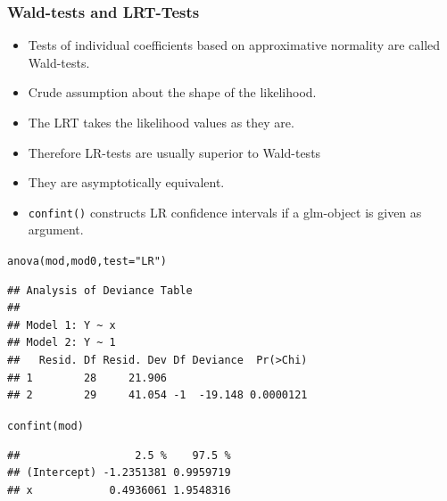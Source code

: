 \documentclass[extsize,handout,10pt]{beamer}\usepackage[]{graphicx}\usepackage[]{color}
\makeatletter
\newcommand{\hlstr}[1]{\textcolor[rgb]{1,0.4,0.2}{#1}}%
\newcommand{\hlstd}[1]{\textcolor[rgb]{0.251,0.251,0.251}{#1}}%
\newcommand{\hlkwc}[1]{\textcolor[rgb]{0.188,0.941,0.314}{#1}}%
\newcommand{\hlkwd}[1]{\textcolor[rgb]{0.69,0.188,0.941}{#1}}%
\newenvironment{kframe}{%
 \def\at@end@of@kframe{}%
 \ifinner\ifhmode%
  \def\at@end@of@kframe{\end{minipage}}%
  \begin{minipage}{\columnwidth}%
 \fi\fi%
 \def\FrameCommand##1{\hskip\@totalleftmargin \hskip-\fboxsep
 \colorbox{shadecolor}{##1}\hskip-\fboxsep
     \hskip-\linewidth \hskip-\@totalleftmargin \hskip\columnwidth}%
 \MakeFramed {\advance\hsize-\width
   \@totalleftmargin\z@ \linewidth\hsize
   \@setminipage}}%
 {\par\unskip\endMakeFramed%
 \at@end@of@kframe}
\newenvironment{knitrout}{}{} %
\makeatother
\begin{document}
\begin{frame}[fragile]
  \frametitle{Wald-tests and LRT-Tests}

  \begin{itemize}
  \item Tests of individual coefficients based on approximative normality are
    called \alert{Wald}-tests. 
  \item Crude assumption about the
    shape of the likelihood. 
  \item The LRT takes the likelihood values as they are. 
  \item Therefore LR-tests are usually superior to Wald-tests
  \item They are asymptotically equivalent.
  \item \texttt{confint()} constructs LR confidence intervals if a
    glm-object is given as argument.
  \end{itemize}

\begin{knitrout}\tiny
{}\color{fgcolor}\begin{kframe}
\begin{alltt}
\hlkwd{anova}\hlstd{(mod,mod0,}\hlkwc{test}\hlstd{=}\hlstr{"LR"}\hlstd{)}
\end{alltt}
\begin{verbatim}
## Analysis of Deviance Table
## 
## Model 1: Y ~ x
## Model 2: Y ~ 1
##   Resid. Df Resid. Dev Df Deviance  Pr(>Chi)
## 1        28     21.906                      
## 2        29     41.054 -1  -19.148 0.0000121
\end{verbatim}
\begin{alltt}
\hlkwd{confint}\hlstd{(mod)}
\end{alltt}


{\ttfamily\noindent\itshape\color{messagecolor}{\#\# Waiting for profiling to be done...}}\begin{verbatim}
##                  2.5 %    97.5 %
## (Intercept) -1.2351381 0.9959719
## x            0.4936061 1.9548316
\end{verbatim}
\end{kframe}
\end{knitrout}




\end{frame}
\end{document}
